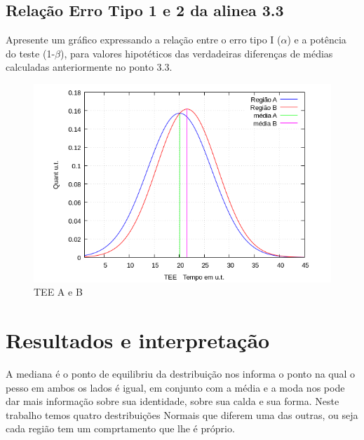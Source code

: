 \subsection{Relação Erro Tipo 1 e 2 da alinea 3.3}
\noindent
Apresente um gráfico expressando a relação entre o erro tipo I ($\alpha$) e a potência do teste (1-$\beta$), para valores hipotéticos das verdadeiras diferenças de médias calculadas anteriormente no ponto 3.3.






\begin{minipage}[!b]{0.40\linewidth}
\begin{figure}[H]
\centering
\includegraphics[scale=0.5]{./image/TEE_NORM_DIST.png}
\caption{TEE A e B}
\label{TEE}
\end{figure}
\end{minipage}

























\newpage
\section{Resultados e interpretação}\label{Resultados}
A mediana é o ponto de equilibriu da destribuição nos informa o ponto na qual o pesso em ambos os lados é igual, em conjunto com a média e a moda nos pode dar mais informação sobre sua identidade, sobre sua calda e sua forma.
Neste trabalho temos quatro destribuições Normais que diferem uma das outras, ou seja cada região tem um comprtamento que lhe é próprio.




